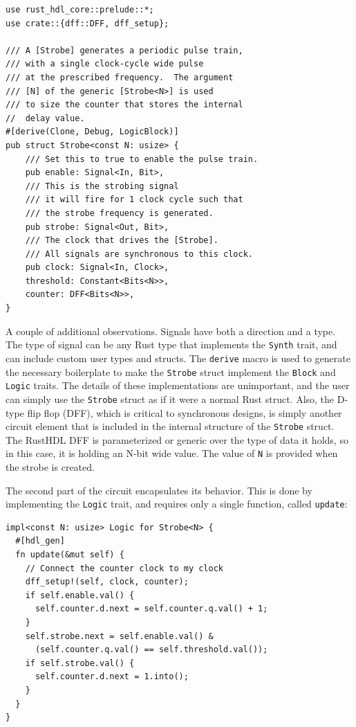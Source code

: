 \documentclass[conference]{IEEEtran}
\begin{document}
\begin{verbatim}
use rust_hdl_core::prelude::*;
use crate::{dff::DFF, dff_setup};

/// A [Strobe] generates a periodic pulse train, 
/// with a single clock-cycle wide pulse
/// at the prescribed frequency.  The argument 
/// [N] of the generic [Strobe<N>] is used
/// to size the counter that stores the internal 
//  delay value.  
#[derive(Clone, Debug, LogicBlock)]
pub struct Strobe<const N: usize> {
    /// Set this to true to enable the pulse train.
    pub enable: Signal<In, Bit>,
    /// This is the strobing signal 
    /// it will fire for 1 clock cycle such that 
    /// the strobe frequency is generated.
    pub strobe: Signal<Out, Bit>,
    /// The clock that drives the [Strobe].  
    /// All signals are synchronous to this clock.
    pub clock: Signal<In, Clock>,
    threshold: Constant<Bits<N>>,
    counter: DFF<Bits<N>>,
}
\end{verbatim}

A couple of additional observations.  Signals have both a direction and a type.  The type of
signal can be any Rust type that implements the \verb|Synth| trait, and can include custom user
types and structs.  The \verb|derive| macro is used to generate the necessary boilerplate to make the 
\verb|Strobe| struct implement the \verb|Block| and \verb|Logic| traits.  The details of these implementations are
unimportant, and the user can simply use the \verb|Strobe| struct as if it were a normal Rust struct.  Also,
the D-type flip flop (DFF), which is critical to synchronous designs, is simply another circuit element that
is included in the internal structure of the \verb|Strobe| struct.  The RustHDL DFF is parameterized or 
generic over the type of data it holds, so in this case, it is holding an N-bit wide value.  The value of
\verb|N| is provided when the strobe is created.

The second part of the circuit encapsulates its behavior.  This is done by implementing the \verb|Logic| trait,
and requires only a single function, called \verb|update|:

\begin{verbatim}
impl<const N: usize> Logic for Strobe<N> {
  #[hdl_gen]
  fn update(&mut self) {
    // Connect the counter clock to my clock
    dff_setup!(self, clock, counter);
    if self.enable.val() {
      self.counter.d.next = self.counter.q.val() + 1;
    }
    self.strobe.next = self.enable.val() & 
      (self.counter.q.val() == self.threshold.val());
    if self.strobe.val() {
      self.counter.d.next = 1.into();
    }
  }
}
\end{verbatim}
\end{document}
